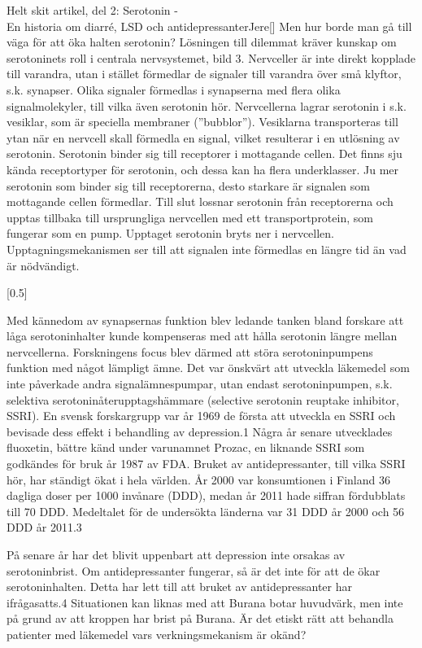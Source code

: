 \documentclass{spektraklet}
\begin{document}
\begin{artikel}{Helt skit artikel, del 2: Serotonin - \\ En historia om diarré, LSD och antidepressanter}{Jere}[]
Men hur borde man gå till väga för att öka halten serotonin? Lösningen till dilemmat kräver kunskap om serotoninets roll i centrala nervsystemet, bild 3. Nervceller är inte direkt kopplade till varandra, utan i stället förmedlar de signaler till varandra över små klyftor, s.k. synapser. Olika signaler förmedlas i synapserna med flera olika signalmolekyler, till vilka även serotonin hör. Nervcellerna lagrar serotonin i s.k. vesiklar, som är speciella membraner (”bubblor”). Vesiklarna transporteras till ytan när en nervcell skall förmedla en signal, vilket resulterar i en utlösning av serotonin. Serotonin binder sig till receptorer i mottagande cellen. Det finns sju kända receptortyper för serotonin, och dessa kan ha flera underklasser. Ju mer serotonin som binder sig till receptorerna, desto starkare är signalen som mottagande cellen förmedlar. Till slut lossnar serotonin från receptorerna och upptas tillbaka till ursprungliga nervcellen med ett transportprotein, som fungerar som en pump. Upptaget serotonin bryts ner i nervcellen. Upptagningsmekanismen ser till att signalen inte förmedlas en längre tid än vad är nödvändigt.

[0.5\columnwidth]


Med kännedom av synapsernas funktion blev ledande tanken bland forskare att låga serotoninhalter kunde kompenseras med att hålla serotonin längre mellan nervcellerna. Forskningens focus blev därmed att störa serotoninpumpens funktion med något lämpligt ämne. Det var önskvärt att utveckla läkemedel som inte påverkade andra signalämnespumpar, utan endast serotoninpumpen, s.k. selektiva serotoninåterupptagshämmare (selective serotonin reuptake inhibitor, SSRI). En svensk forskargrupp var år 1969 de första att utveckla en SSRI och bevisade dess effekt i behandling av depression.1 Några år senare utvecklades fluoxetin, bättre känd under varunamnet Prozac, en liknande SSRI som godkändes för bruk år 1987 av FDA. Bruket av antidepressanter, till vilka SSRI hör, har ständigt ökat i hela världen. År 2000 var konsumtionen i Finland 36 dagliga doser per 1000 invånare (DDD), medan år 2011 hade siffran fördubblats till 70 DDD. Medeltalet för de undersökta länderna var 31 DDD år 2000 och 56 DDD år 2011.3

På senare år har det blivit uppenbart att depression inte orsakas av serotoninbrist. Om antidepressanter fungerar, så är det inte för att de ökar serotoninhalten. Detta har lett till att bruket av antidepressanter har ifrågasatts.4 Situationen kan liknas med att Burana botar huvudvärk, men inte på grund av att kroppen har brist på Burana. Är det etiskt rätt att behandla patienter med läkemedel vars verkningsmekanism är okänd?


\end{artikel}
\end{document}
